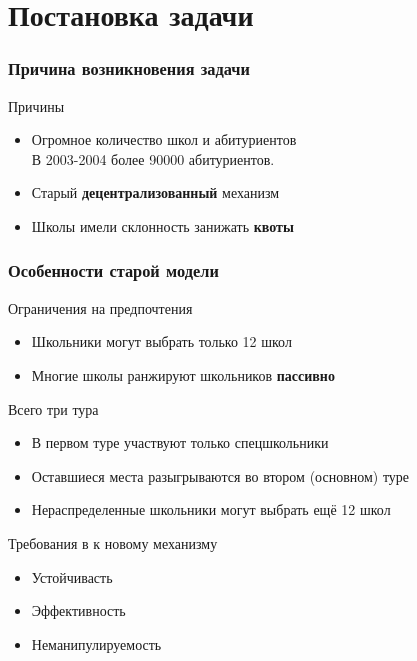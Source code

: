 \documentclass[10pt,pdf,hyperref={unicode}]{beamer}
\begin{document}
\section{Постановка задачи}

\begin{frame}
    \frametitle{Причина возникновения задачи}
    \begin{block}{Причины}
        \begin{itemize}
            \item Огромное количество школ и абитуриентов\\В 2003-2004 более 90000 абитуриентов.
            \item Старый {\bf децентрализованный} механизм
            \item Школы имели склонность занижать {\bf квоты}
        \end{itemize}
    \end{block}
\end{frame}

\begin{frame}
    \frametitle{Особенности старой модели}
    \begin{block}{Ограничения на предпочтения}
        \begin{itemize}
            \item Школьники могут выбрать только 12 школ
            \item Многие школы ранжируют школьников {\bf пассивно}
        \end{itemize}
    \end{block}

    \begin{block}{Всего три тура}
        \begin{itemize}
            \item В первом туре участвуют только спецшкольники
            \item Оставшиеся места разыгрываются во втором (основном) туре
            \item Нераспределенные школьники могут выбрать ещё 12 школ
        \end{itemize}
    \end{block}

    \begin{block}{Требования в к новому механизму}
        \begin{itemize}
            \item Устойчивасть
            \item Эффективность
            \item Неманипулируемость
        \end{itemize}
    \end{block}
\end{frame}
\end{document}
